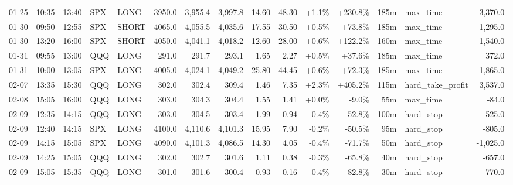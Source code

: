 \documentclass[11pt,a4paper,twoside]{article}
\begin{document}
\begin{landscape}
\begin{center}
\begin{longtable}{>{\color{txtmain}}l l l l l r r r r r r r r >{\color{txtmain}}l r}
01-25 & 10:35 & 13:40 & SPX & LONG & 3950.0 & 3,955.4 & 3,997.8 & 14.60 & 48.30 & \textcolor{wingreen}{+1.1\%} & \textcolor{wingreen}{+230.8\%} & 185m & max\_time & \textcolor{wingreen}{3,370.0} \\
01-30 & 09:50 & 12:55 & SPX & SHORT & 4065.0 & 4,055.5 & 4,035.6 & 17.55 & 30.50 & \textcolor{wingreen}{+0.5\%} & \textcolor{wingreen}{+73.8\%} & 185m & max\_time & \textcolor{wingreen}{1,295.0} \\
01-30 & 13:20 & 16:00 & SPX & SHORT & 4050.0 & 4,041.1 & 4,018.2 & 12.60 & 28.00 & \textcolor{wingreen}{+0.6\%} & \textcolor{wingreen}{+122.2\%} & 160m & max\_time & \textcolor{wingreen}{1,540.0} \\
01-31 & 09:55 & 13:00 & QQQ & LONG & 291.0 & 291.7 & 293.1 & 1.65 & 2.27 & \textcolor{wingreen}{+0.5\%} & \textcolor{wingreen}{+37.6\%} & 185m & max\_time & \textcolor{wingreen}{372.0} \\
01-31 & 10:00 & 13:05 & SPX & LONG & 4005.0 & 4,024.1 & 4,049.2 & 25.80 & 44.45 & \textcolor{wingreen}{+0.6\%} & \textcolor{wingreen}{+72.3\%} & 185m & max\_time & \textcolor{wingreen}{1,865.0} \\
02-07 & 13:35 & 15:30 & QQQ & LONG & 302.0 & 302.4 & 309.4 & 1.46 & 7.35 & \textcolor{wingreen}{+2.3\%} & \textcolor{wingreen}{+405.2\%} & 115m & hard\_take\_profit & \textcolor{wingreen}{3,537.0} \\
02-08 & 15:05 & 16:00 & QQQ & LONG & 303.0 & 304.3 & 304.4 & 1.55 & 1.41 & \textcolor{wingreen}{+0.0\%} & \textcolor{lossred}{-9.0\%} & 55m & max\_time & \textcolor{lossred}{-84.0} \\
02-09 & 12:35 & 14:15 & QQQ & LONG & 303.0 & 304.5 & 303.4 & 1.99 & 0.94 & \textcolor{lossred}{-0.4\%} & \textcolor{lossred}{-52.8\%} & 100m & hard\_stop & \textcolor{lossred}{-525.0} \\
02-09 & 12:40 & 14:15 & SPX & LONG & 4100.0 & 4,110.6 & 4,101.3 & 15.95 & 7.90 & \textcolor{lossred}{-0.2\%} & \textcolor{lossred}{-50.5\%} & 95m & hard\_stop & \textcolor{lossred}{-805.0} \\
02-09 & 14:15 & 15:05 & SPX & LONG & 4090.0 & 4,101.3 & 4,086.5 & 14.30 & 4.05 & \textcolor{lossred}{-0.4\%} & \textcolor{lossred}{-71.7\%} & 50m & hard\_stop & \textcolor{lossred}{-1,025.0} \\
02-09 & 14:25 & 15:05 & QQQ & LONG & 302.0 & 302.7 & 301.6 & 1.11 & 0.38 & \textcolor{lossred}{-0.3\%} & \textcolor{lossred}{-65.8\%} & 40m & hard\_stop & \textcolor{lossred}{-657.0} \\
02-09 & 15:05 & 15:35 & QQQ & LONG & 301.0 & 301.6 & 300.4 & 0.93 & 0.16 & \textcolor{lossred}{-0.4\%} & \textcolor{lossred}{-82.8\%} & 30m & hard\_stop & \textcolor{lossred}{-770.0} \\

\end{longtable}
\end{center}
\end{landscape}
\end{document}
